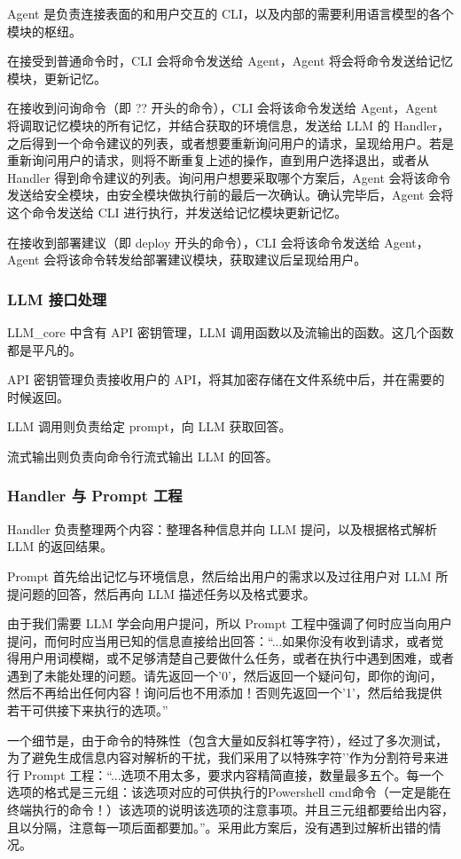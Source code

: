 \documentclass{article}
\theoremstyle{plain}
\theoremstyle{definition}
\theoremstyle{remark}
\begin{document}
Agent 是负责连接表面的和用户交互的 CLI，以及内部的需要利用语言模型的各个模块的枢纽。

在接受到普通命令时，CLI 会将命令发送给 Agent，Agent 将会将命令发送给记忆模块，更新记忆。

在接收到问询命令（即 ?? 开头的命令），CLI 会将该命令发送给 Agent，Agent 将调取记忆模块的所有记忆，并结合获取的环境信息，发送给 LLM 的 Handler，之后得到一个命令建议的列表，或者想要重新询问用户的请求，呈现给用户。若是重新询问用户的请求，则将不断重复上述的操作，直到用户选择退出，或者从 Handler 得到命令建议的列表。询问用户想要采取哪个方案后，Agent 会将该命令发送给安全模块，由安全模块做执行前的最后一次确认。确认完毕后，Agent 会将这个命令发送给 CLI 进行执行，并发送给记忆模块更新记忆。

在接收到部署建议（即 deploy 开头的命令），CLI 会将该命令发送给 Agent，Agent 会将该命令转发给部署建议模块，获取建议后呈现给用户。

\subsubsection{LLM 接口处理}

LLM\_core 中含有 API 密钥管理，LLM 调用函数以及流输出的函数。这几个函数都是平凡的。

API 密钥管理负责接收用户的 API，将其加密存储在文件系统中后，并在需要的时候返回。

LLM 调用则负责给定 prompt，向 LLM 获取回答。

流式输出则负责向命令行流式输出 LLM 的回答。

\subsubsection{Handler 与 Prompt 工程}

Handler 负责整理两个内容：整理各种信息并向 LLM 提问，以及根据格式解析 LLM 的返回结果。

Prompt 首先给出记忆与环境信息，然后给出用户的需求以及过往用户对 LLM 所提问题的回答，然后再向 LLM 描述任务以及格式要求。

由于我们需要 LLM 学会向用户提问，所以 Prompt 工程中强调了何时应当向用户提问，而何时应当用已知的信息直接给出回答：“...如果你没有收到请求，或者觉得用户用词模糊，或不足够清楚自己要做什么任务，或者在执行中遇到困难，或者遇到了未能处理的问题。请先返回一个'0'，然后返回一个疑问句，即你的询问，然后不再给出任何内容！询问后也不用添加{}！否则先返回一个'1'，然后给我提供若干可供接下来执行的选项。”

一个细节是，由于命令的特殊性（包含大量如反斜杠等字符），经过了多次测试，为了避免生成信息内容对解析的干扰，我们采用了以特殊字符'{}'作为分割符号来进行 Prompt 工程：“...选项不用太多，要求内容精简直接，数量最多五个。每一个选项的格式是三元组：该选项对应的可供执行的Powershell cmd命令（一定是能在终端执行的命令！）{}该选项的说明{}该选项的注意事项{}。并且三元组都要给出内容，且以{}分隔，注意每一项后面都要加{}。”。采用此方案后，没有遇到过解析出错的情况。
\end{document}
